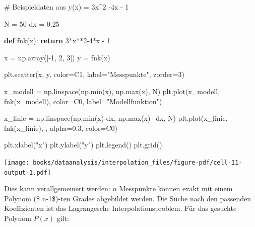 \documentclass[
  letterpaper,
  DIV=11,
  numbers=noendperiod]{scrreprt}
\newenvironment{Shaded}{\begin{snugshade}}{\end{snugshade}}
\newcommand{\BuiltInTok}[1]{\textcolor[rgb]{0.00,0.23,0.31}{#1}}
\newcommand{\CommentTok}[1]{\textcolor[rgb]{0.37,0.37,0.37}{#1}}
\newcommand{\ControlFlowTok}[1]{\textcolor[rgb]{0.00,0.23,0.31}{\textbf{#1}}}
\newcommand{\DecValTok}[1]{\textcolor[rgb]{0.68,0.00,0.00}{#1}}
\newcommand{\FloatTok}[1]{\textcolor[rgb]{0.68,0.00,0.00}{#1}}
\newcommand{\KeywordTok}[1]{\textcolor[rgb]{0.00,0.23,0.31}{\textbf{#1}}}
\newcommand{\NormalTok}[1]{\textcolor[rgb]{0.00,0.23,0.31}{#1}}
\newcommand{\OperatorTok}[1]{\textcolor[rgb]{0.37,0.37,0.37}{#1}}
\newcommand{\StringTok}[1]{\textcolor[rgb]{0.13,0.47,0.30}{#1}}
\begin{document}
\begin{Shaded}
\begin{Highlighting}[]
\CommentTok{\# Beispieldaten aus y(x) = 3x\^{}2 {-}4x {-} 1}

\NormalTok{N }\OperatorTok{=} \DecValTok{50}
\NormalTok{dx }\OperatorTok{=} \FloatTok{0.25}

\KeywordTok{def}\NormalTok{ fnk(x):}
    \ControlFlowTok{return} \DecValTok{3}\OperatorTok{*}\NormalTok{x}\OperatorTok{**}\DecValTok{2}\OperatorTok{{-}}\DecValTok{4}\OperatorTok{*}\NormalTok{x }\OperatorTok{{-}} \DecValTok{1}

\NormalTok{x }\OperatorTok{=}\NormalTok{ np.array([}\OperatorTok{{-}}\DecValTok{1}\NormalTok{, }\DecValTok{2}\NormalTok{, }\DecValTok{3}\NormalTok{])}
\NormalTok{y }\OperatorTok{=}\NormalTok{ fnk(x)}

\NormalTok{plt.scatter(x, y, color}\OperatorTok{=}\StringTok{\textquotesingle{}C1\textquotesingle{}}\NormalTok{, label}\OperatorTok{=}\StringTok{"Messpunkte"}\NormalTok{, zorder}\OperatorTok{=}\DecValTok{3}\NormalTok{)}

\NormalTok{x\_modell }\OperatorTok{=}\NormalTok{ np.linspace(np.}\BuiltInTok{min}\NormalTok{(x), np.}\BuiltInTok{max}\NormalTok{(x), N)}
\NormalTok{plt.plot(x\_modell, fnk(x\_modell), color}\OperatorTok{=}\StringTok{\textquotesingle{}C0\textquotesingle{}}\NormalTok{, label}\OperatorTok{=}\StringTok{"Modellfunktion"}\NormalTok{)}

\NormalTok{x\_linie }\OperatorTok{=}\NormalTok{ np.linspace(np.}\BuiltInTok{min}\NormalTok{(x)}\OperatorTok{{-}}\NormalTok{dx, np.}\BuiltInTok{max}\NormalTok{(x)}\OperatorTok{+}\NormalTok{dx, N)}
\NormalTok{plt.plot(x\_linie, fnk(x\_linie), }\StringTok{\textquotesingle{}{-}{-}\textquotesingle{}}\NormalTok{, alpha}\OperatorTok{=}\FloatTok{0.3}\NormalTok{, color}\OperatorTok{=}\StringTok{\textquotesingle{}C0\textquotesingle{}}\NormalTok{)}

\NormalTok{plt.xlabel(}\StringTok{"x"}\NormalTok{)}
\NormalTok{plt.ylabel(}\StringTok{"y"}\NormalTok{)}
\NormalTok{plt.legend()}
\NormalTok{plt.grid()}
\end{Highlighting}
\end{Shaded}

\texttt{[image: books/dataanalysis/interpolation\_files/figure-pdf/cell-11-output-1.pdf]}

Dies kann verallgemeinert werden: \(n\) Messpunkte können exakt mit
einem Polynom (\$ n-1\$)-ten Grades abgebildet werden. Die Suche nach
den passenden Koeffizienten ist das Lagrangesche Interpolationsproblem.
Für das gesuchte Polynom \(P(x)\) gilt:
\end{document}
